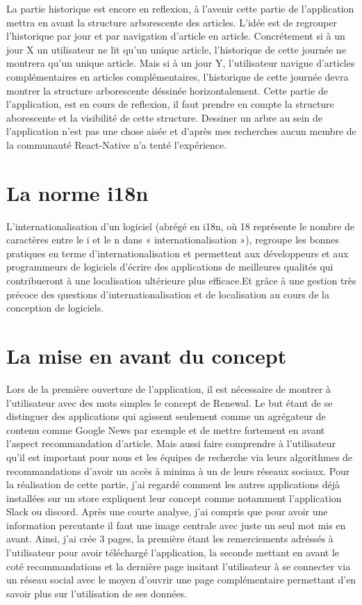 La partie historique est encore en reflexion, à l'avenir cette partie de l'application mettra en avant la structure arborescente des articles. L'idée est de regrouper l'historique par jour et par navigation d'article en article. Concrétement si à un jour X un utilisateur ne lit qu'un unique article, l'historique de cette journée ne montrera qu'un unique article. Mais si à un jour Y, l'utilisateur navigue d'articles complémentaires en articles complémentaires, l'historique de cette journée devra montrer la structure arborescente déssinée horizontalement. Cette partie de l'application, est en cours de reflexion, il faut prendre en compte la structure aborescente et la visibilité de cette structure. Dessiner un arbre au sein de l'application n'est pas une chose aisée et d'après mes recherches aucun membre de la communauté React-Native n'a tenté l'expérience.  

\section{La norme i18n}

L'internationalisation d'un logiciel (abrégé en i18n, où 18 représente le nombre de caractères entre le i et le n dans « internationalisation »), regroupe les bonnes pratiques en terme d'internationalisation et permettent aux développeurs et aux programmeurs de logiciels d'écrire des applications de meilleures qualités qui contribueront à une localisation ultérieure plus efficace.Et grâce à une gestion très précoce des questions d'internationalisation et de localisation au cours de la conception de logiciels. 

\section{La mise en avant du concept}

Lors de la première ouverture de l'application, il est nécessaire de montrer à l'utilisateur avec des mots simples le concept de Renewal. Le but étant de se distinguer des applications qui agissent seulement comme un agrégateur de contenu comme Google News par exemple et de mettre fortement en avant l'aspect recommandation d'article. Mais aussi faire comprendre à l'utilisateur qu'il est important pour nous et les équipes de recherche via leurs algorithmes de recommandations d'avoir un accès à minima à un de leurs réseaux sociaux. Pour la réalisation de cette partie, j'ai regardé comment les autres applications déjà installées sur un store expliquent leur concept comme notamment l'application Slack ou discord. Après une courte analyse, j'ai compris que pour avoir une information percutante il faut une image centrale avec juste un seul mot mis en avant. Ainsi, j'ai crée 3 pages, la première étant les remerciements adréssés à l'utilisateur pour avoir téléchargé l'application, la seconde mettant en avant le coté recommandations et la dernière page insitant l'utilisateur à se connecter via un réseau social avec le moyen d'ouvrir une page complémentaire permettant d'en savoir plus sur l'utilisation de ses données. 



